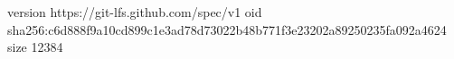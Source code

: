 version https://git-lfs.github.com/spec/v1
oid sha256:c6d888f9a10cd899c1e3ad78d73022b48b771f3e23202a89250235fa092a4624
size 12384
